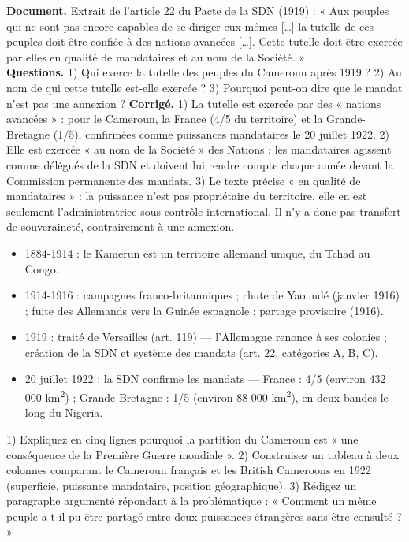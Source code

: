 \documentclass[11pt]{article}
\begin{document}
\begin{exoresolu}
\textbf{Document.} Extrait de l'article 22 du Pacte de la SDN (1919) : « Aux peuples qui ne sont pas encore capables de se diriger eux-mêmes […] la tutelle de ces peuples doit être confiée à des nations avancées […]. Cette tutelle doit être exercée par elles en qualité de mandataires et au nom de la Société. »\\
\textbf{Questions.} 1) Qui exerce la tutelle des peuples du Cameroun après 1919 ? 2) Au nom de qui cette tutelle est-elle exercée ? 3) Pourquoi peut-on dire que le mandat n'est pas une annexion ?
\tcblower
\textbf{Corrigé.} 1) La tutelle est exercée par des « nations avancées » : pour le Cameroun, la France (4/5 du territoire) et la Grande-Bretagne (1/5), confirmées comme puissances mandataires le 20 juillet 1922. 2) Elle est exercée « au nom de la Société » des Nations : les mandataires agissent comme délégués de la SDN et doivent lui rendre compte chaque année devant la Commission permanente des mandats. 3) Le texte précise « en qualité de mandataires » : la puissance n'est pas propriétaire du territoire, elle en est seulement l'administratrice sous contrôle international. Il n'y a donc pas transfert de souveraineté, contrairement à une annexion.
\end{exoresolu}

\begin{aretenir}
\begin{itemize}
\item 1884-1914 : le Kamerun est un territoire allemand unique, du Tchad au Congo.
\item 1914-1916 : campagnes franco-britanniques ; chute de Yaoundé (janvier 1916) ; fuite des Allemands vers la Guinée espagnole ; partage provisoire (1916).
\item 1919 : traité de Versailles (art. 119) — l'Allemagne renonce à ses colonies ; création de la SDN et système des mandats (art. 22, catégories A, B, C).
\item 20 juillet 1922 : la SDN confirme les mandats — France : 4/5 (environ 432 000 km\textsuperscript{2}) ; Grande-Bretagne : 1/5 (environ 88 000 km\textsuperscript{2}), en deux bandes le long du Nigeria.
\end{itemize}
\end{aretenir}

\begin{exercice}
1) Expliquez en cinq lignes pourquoi la partition du Cameroun est « une conséquence de la Première Guerre mondiale ». 2) Construisez un tableau à deux colonnes comparant le Cameroun français et les British Cameroons en 1922 (superficie, puissance mandataire, position géographique). 3) Rédigez un paragraphe argumenté répondant à la problématique : « Comment un même peuple a-t-il pu être partagé entre deux puissances étrangères sans être consulté ? »
\end{exercice}
\end{document}

